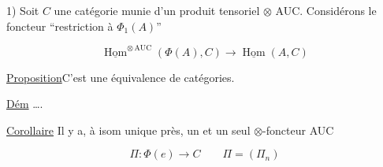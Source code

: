 1) Soit $C$ une catégorie munie d'un produit tensoriel $\otimes$ AUC. Considérons le foncteur ``restriction à $\Phi_1(A)$''

\[\underline{\operatorname{Hom}}^{\otimes\,\mathrm{AUC}}(\Phi(A),C)\longrightarrow\underline{\operatorname{Hom}}(A,C)\]

\uline{Proposition}\quad C'est une équivalence de catégories.

\uline{Dém} \ldots.

\uline{Corollaire}\quad {} Il y a, à isom unique près, un et un seul $\otimes$-foncteur AUC

\[\Pi:\Phi(e)\longrightarrow C\qquad\Pi=(\Pi_n)\]

